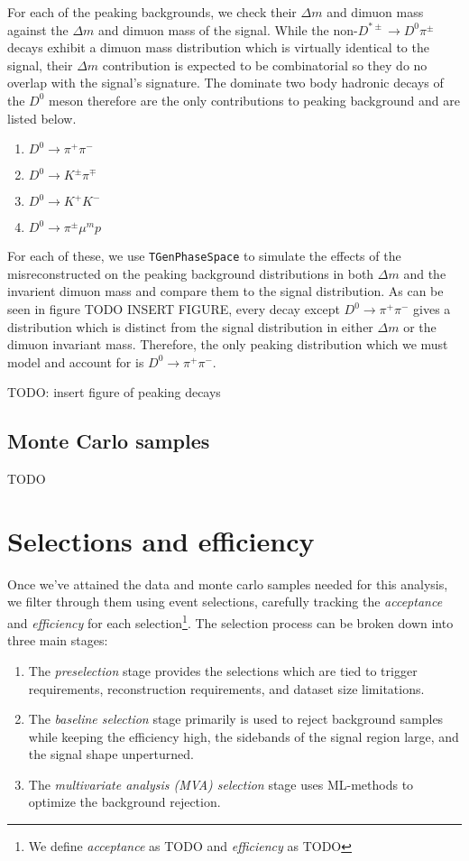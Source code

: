 For each of the peaking backgrounds, we check their $\Delta m$ and dimuon mass against the $\Delta m$ and dimuon mass of the signal. While the non-$D^{*\pm} \to D^0 \pi^\pm$ decays exhibit a dimuon mass distribution which is virtually identical to the signal, their $\Delta m$ contribution is expected to be combinatorial so they do no overlap with the signal's signature. The dominate two body hadronic decays of the $D^0$ meson therefore are the only contributions to peaking background and are listed below.
\begin{enumerate}
    \item $D^0 \to \pi^+ \pi^-$
    \item $D^0 \to K^\pm \pi^\mp$
    \item $D^0 \to K^+ K^-$
    \item $D^0 \to \pi^\pm \mu^mp$
\end{enumerate}
For each of these, we use \texttt{TGenPhaseSpace} to simulate the effects of the misreconstructed on the peaking background distributions in both $\Delta m$ and the invarient dimuon mass and compare them to the signal distribution. As can be seen in figure TODO INSERT FIGURE, every decay except $D^0 \to \pi^+ \pi^-$ gives a distribution which is distinct from the signal distribution in either $\Delta m$ or the dimuon invariant mass. Therefore, the only peaking distribution which we must model and account for is $D^0 \to \pi^+ \pi^-$. 

TODO: insert figure of peaking decays


\subsection{Monte Carlo samples}

TODO

\section{Selections and efficiency}

Once we've attained the data and monte carlo samples needed for this analysis, we filter through them using event selections, carefully tracking the \textit{acceptance} and \textit{efficiency} for each selection\footnote{We define \textit{acceptance} as TODO and \textit{efficiency} as TODO}. The selection process can be broken down into three main stages:
\begin{enumerate}
    \item The \textit{preselection} stage provides the selections which are tied to trigger requirements, reconstruction requirements, and dataset size limitations.
    \item The \textit{baseline selection} stage primarily is used to reject background samples while keeping the efficiency high, the sidebands of the signal region large, and the signal shape unperturned. 
    \item The \textit{multivariate analysis (MVA) selection} stage uses ML-methods to optimize the background rejection.
\end{enumerate}

